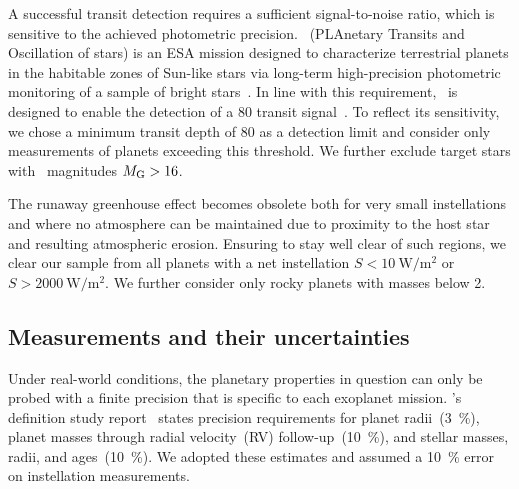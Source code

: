 \documentclass[twocolumn,twocolappendix]{aastex631}
\begin{document}
A successful transit detection requires a sufficient signal-to-noise ratio, which is sensitive to the achieved photometric precision. %
\plato\ (PLAnetary Transits and Oscillation of stars) is an ESA mission designed to characterize terrestrial planets in the habitable zones of Sun-like stars via long-term high-precision photometric monitoring of a sample of bright stars~\citep{Rauer2016}.
In line with this requirement, \plato\ is designed to enable the detection of a \SI{80}{\ppm} transit signal~\citep[][Matuszewski et al., in prep.]{plato2017}.
To reflect its sensitivity, we chose a minimum transit depth of \SI{80}{\ppm} as a detection limit and consider only measurements of planets exceeding this threshold.
We further exclude target stars with \gaia\ magnitudes $M_\mathrm{G} > 16$.

The runaway greenhouse effect becomes obsolete both for very small instellations and where no atmosphere can be maintained due to proximity to the host star and resulting atmospheric erosion.
Ensuring to stay well clear of such regions, we clear our sample from all planets with a net instellation $S < \SI{10}{\watt\per\square\meter}$ or $S > \SI{2000}{\watt\per\square\meter}$.
We further consider only rocky planets with masses below \SI{2}{\Mearth}. %

\subsection{Measurements and their uncertainties}
Under real-world conditions, the planetary properties in question can only be probed with a finite precision that is specific to each exoplanet mission.
\plato's definition study report~\citep{plato2017} states precision requirements for planet radii~(\SI{3}{\percent}), planet masses through radial velocity~(RV) follow-up~(\SI{10}{\percent}), and stellar masses, radii, and ages~(\SI{10}{\percent}).
We adopted these estimates and assumed a \SI{10}{\percent} error on instellation measurements.
\end{document}
